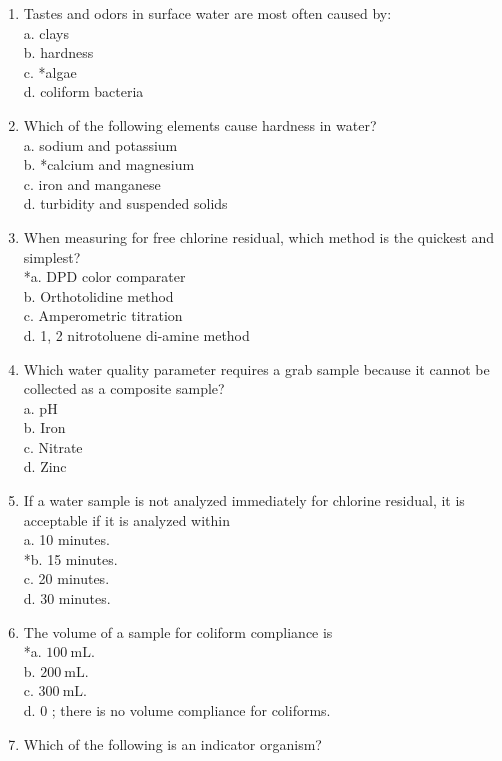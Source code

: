 \begin{enumerate}[1.]
\item Tastes and odors in surface water are most often caused by:\\
a. clays\\
b. hardness\\
c. *algae\\
d. coliform bacteria\\
\item Which of the following elements cause hardness in water?\\
a. sodium and potassium\\
b. *calcium and magnesium\\
c. iron and manganese\\
d. turbidity and suspended solids\\
\item When measuring for free chlorine residual, which method is the quickest and simplest?\\
*a. DPD color comparater\\
b. Orthotolidine method\\
c. Amperometric titration\\
d. 1, 2 nitrotoluene di-amine method\\
\item Which water quality parameter requires a grab sample because it cannot be collected as a composite sample?\\
a. $\mathrm{pH}$\\
b. Iron\\
c. Nitrate\\
d. Zinc\\
\item If a water sample is not analyzed immediately for chlorine residual, it is acceptable if it is analyzed within\\
a. 10 minutes.\\
*b. 15 minutes.\\
c. 20 minutes.\\
d. 30 minutes.\\
\item The volume of a sample for coliform compliance is\\
*a. $100 \mathrm{~mL}$.\\
b. $200 \mathrm{~mL}$.\\
c. $300 \mathrm{~mL}$.\\
d. 0 ; there is no volume compliance for coliforms.\\
\item Which of the following is an indicator organism?\\

\end{enumerate}
